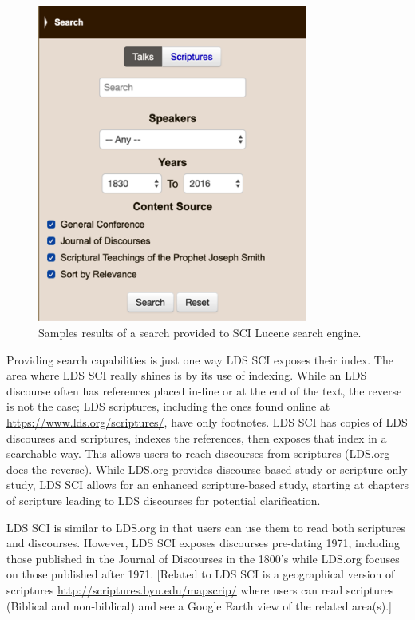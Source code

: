 \begin{figure}[hhhhhtb]
	\centering
		\includegraphics[width=3.5in,natwidth=310,natheight=442]{figures/sci_search.png}
		\caption[SCI TF-IDF Search Results]{
			Samples results of a search provided to SCI Lucene search engine.
		}
	\label{fig:sci_search}
\end{figure}

Providing search capabilities is just one way LDS SCI exposes their index. The area where LDS SCI really shines is by its use of indexing. While an LDS discourse often has references placed in-line or at the end of the text, the reverse is not the case; LDS scriptures, including the ones found online at \url{https://www.lds.org/scriptures/}, have only footnotes. LDS SCI has copies of LDS discourses and scriptures, indexes the references, then exposes that index in a searchable way. This allows users to reach discourses from scriptures (LDS.org does the reverse). While LDS.org provides discourse-based study or scripture-only study, LDS SCI allows for an enhanced scripture-based study, starting at chapters of scripture leading to LDS discourses for potential clarification.

LDS SCI is similar to LDS.org in that users can use them to read both scriptures and discourses. However, LDS SCI exposes discourses pre-dating 1971, including those published in the Journal of Discourses in the 1800’s while LDS.org focuses on those published after 1971. [Related to LDS SCI is a geographical version of scriptures \url{http://scriptures.byu.edu/mapscrip/} where users can read scriptures (Biblical and non-biblical) and see a Google Earth view of the related area(s).]

